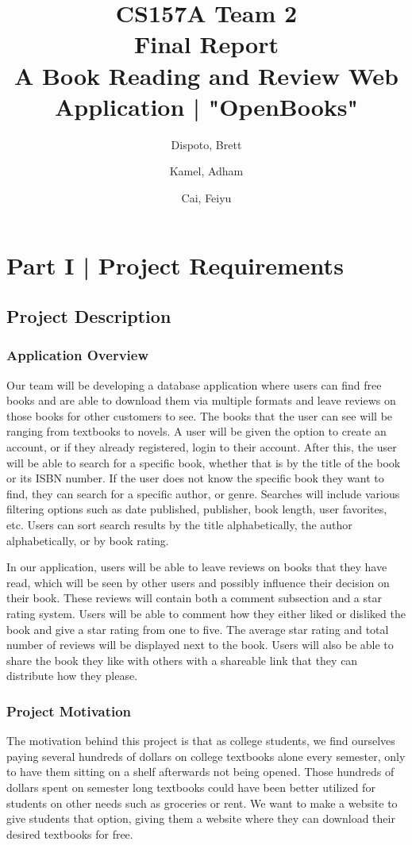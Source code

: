 \documentclass[letter, 12pt, titlepage]{article}
\author{
	Dispoto, Brett\\
        \and
        Kamel, Adham\\
        \and
        Cai, Feiyu\\
}
\title{CS157A Team 2 \\ Final Report\\
        \large A Book Reading and Review Web Application | "OpenBooks"}
\begin{document}
\maketitle
\section{Part I | Project Requirements}
\subsection{Project Description}
\subsubsection{Application Overview}
Our team will be developing a database application where users can find free books and are able to download them via multiple formats and leave reviews on those books for other customers to see. The books that the user can see will be ranging from textbooks to novels. A user will be given the option to create an account, or if they already registered, login to their account. After this, the user will be able to search for a specific book, whether that is by the title of the book or its ISBN number. If the user does not know the specific book they want to find, they can search for a specific author, or genre. Searches will include various filtering options such as date published, publisher, book length, user favorites, etc. Users can sort search results by the title alphabetically, the author alphabetically, or by book rating.

\medskip
In our application, users will be able to leave reviews on books that they have read, which will be seen by other users and possibly influence their decision on their book. These reviews will contain both a comment subsection and a star rating system. Users will be able to comment how they either liked or disliked the book and give a star rating from one to five. The average star rating and total number of reviews will be displayed next to the book. Users will also be able to share the book they like with others with a shareable link that they can distribute how they please.
\subsubsection{Project Motivation}
The motivation behind this project is that as college students, we find ourselves paying several hundreds of dollars on college textbooks alone every semester, only to have them sitting on a shelf afterwards not being opened. Those hundreds of dollars spent on semester long textbooks could have been better utilized for students on other needs such as groceries or rent. We want to make a website to give students that option, giving them a website where they can download their desired textbooks for free.
\end{document}
